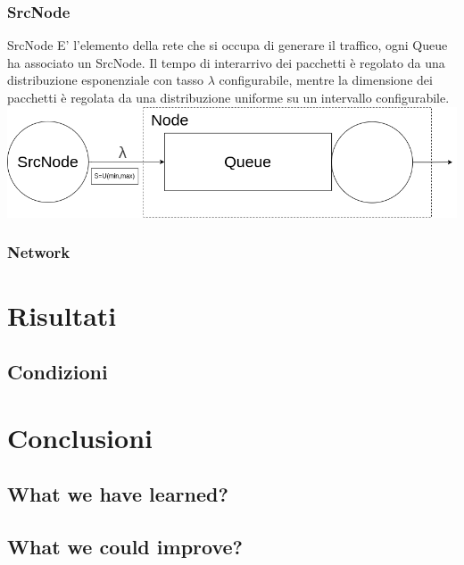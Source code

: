 \documentclass[compress]{beamer}
\begin{document}
\subsubsection*{SrcNode}
\begin{frame}{SrcNode}
    E' l'elemento della rete che si occupa di generare il traffico, ogni Queue ha associato un SrcNode.
    Il tempo di interarrivo dei pacchetti è regolato da una distribuzione esponenziale con tasso $\lambda$ configurabile, mentre la dimensione dei pacchetti è regolata da una distribuzione uniforme su un intervallo configurabile.
    \begin{adjustbox}{margin=0.5cm 0cm 0.5cm 0.5cm, center} %
        \includegraphics[width=1\textwidth]{figs/src_scheme.png}
    \end{adjustbox}
\end{frame}

\subsubsection*{Network}


\section*{Risultati}

\subsection*{Condizioni}


\section*{Conclusioni}

\subsection*{What we have learned?}

\subsection*{What we could improve?}
\end{document}
